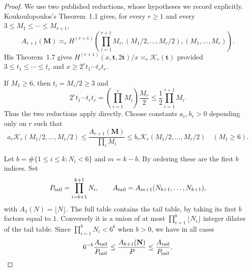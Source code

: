 \begin{proof}
We use two published reductions, whose hypotheses we record explicitly.
Koukoulopoulos's Theorem~1.1 \cite{Kouk} gives, for every $r\ge1$ and every
$3\le M_1\le\cdots\le M_{r+1}$,
\[
 A_{r+1}(\mathbf M)\asymp_r
 H^{(r+1)}\left(\prod_{i=1}^{r+1}M_i,
                   (M_1/2,\ldots,M_r/2),(M_1,\ldots,M_r)\right).
\]
His Theorem~1.7 \cite{Kouk} gives $H^{(r+1)}(x,\mathbf t,2\mathbf t)/x
\asymp_r\mathcal K_r(\mathbf t)$ provided
$3\le t_1\le\cdots\le t_r$ and
$x\ge2^r t_1\cdots t_rt_r$.

If $M_1\ge6$, then $t_i=M_i/2\ge3$ and
\[
 2^r t_1\cdots t_rt_r
 =\left(\prod_{i=1}^rM_i\right)\frac{M_r}{2}
 \le\frac12\prod_{i=1}^{r+1}M_i.
\]
Thus the two reductions apply directly. Choose constants $a_r,b_r>0$
depending only on $r$ such that
\begin{equation}\label{eq:table-large-axis}
 a_r\mathcal K_r(M_1/2,\ldots,M_r/2)
 \le\frac{A_{r+1}(\mathbf M)}{\prod_iM_i}
 \le b_r\mathcal K_r(M_1/2,\ldots,M_r/2)
 \quad(M_1\ge6).
\end{equation}

Let $b=\#\{1\le i\le k:N_i<6\}$ and $m=k-b$.
By ordering these are the first $b$ indices. Set
\[
 P_{\rm tail}=\prod_{i=b+1}^{k+1}N_i,\qquad
 A_{\rm tail}=A_{m+1}(N_{b+1},\ldots,N_{k+1}),
\]
with $A_1(N)=\lfloor N\rfloor$.
The full table contains the tail table, by taking its first $b$
factors equal to $1$. Conversely it is a union of at most
$\prod_{i=1}^b\lfloor N_i\rfloor$ integer dilates of the tail table.
Since $\prod_{i=1}^bN_i<6^b$ when $b>0$, we have in all cases
\begin{equation}\label{eq:table-delete-axes}
 6^{-b}\frac{A_{\rm tail}}{P_{\rm tail}}
 \le\frac{A_{k+1}(\mathbf N)}P
 \le\frac{A_{\rm tail}}{P_{\rm tail}}.
\end{equation}


\end{proof}
